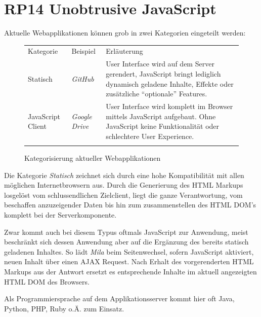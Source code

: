 \section{RP14 Unobtrusive JavaScript}
\label{sec:principle-rp14-unobtrusive-javascript}

Aktuelle Webapplikationen können grob in zwei Kategorien eingeteilt werden:

\begin{figure}[H]
	\begin{table}[H]
		\tablestyle
		\tablealtcolored
		\begin{tabularx}{\textwidth}{l l X}
			\tableheadcolor
				\tablehead Kategorie &
				\tablehead Beispiel &
				\tablehead Erläuterung
				\tabularnewline
			\tablebody
				Statisch &
				\emph{GitHub} \cite{GitHub} &
				User Interface wird auf dem Server gerendert, JavaScript bringt lediglich dynamisch geladene Inhalte, Effekte oder zusätzliche ``optionale'' Features.
				\tabularnewline

				JavaScript Client &
				\emph{Google Drive} \cite{GoogleDrive} &
				User Interface wird komplett im Browser mittels JavaScript aufgebaut. Ohne JavaScript keine Funktionalität oder schlechtere User Experience.
				\tabularnewline
			\tableend
		\end{tabularx}
	\end{table}
	\caption{Kategorisierung aktueller Webapplikationen}
	\label{tab:current-webapplication-categories}
\end{figure}

Die Kategorie \emph{Statisch} zeichnet sich durch eine hohe Kompatibilität mit allen möglichen Internetbrowsern aus. Durch die Generierung des HTML Markups losgelöst vom schlussendlichen Zielclient, liegt die ganze Verantwortung, vom beschaffen anzuzeigender Daten bis hin zum zusammenstellen des HTML \gls{DOM}'s komplett bei der Serverkomponente.

Zwar kommt auch bei diesem Typus oftmals JavaScript zur Anwendung, meist beschränkt sich dessen Anwendung aber auf die Ergänzung des bereits statisch geladenen Inhaltes. So lädt \emph{Mila} \cite{Mila} beim Seitenwechsel, sofern JavaScript aktiviert, neuen Inhalt über einen \gls{AJAX} Request. Nach Erhalt des vorgerenderten HTML Markups aus der Antwort ersetzt es entsprechende Inhalte im aktuell angezeigten HTML \gls{DOM} des Browsers.

Als Programmiersprache auf dem Applikationsserver kommt hier oft Java, Python, PHP, Ruby o.Ä. zum Einsatz.

